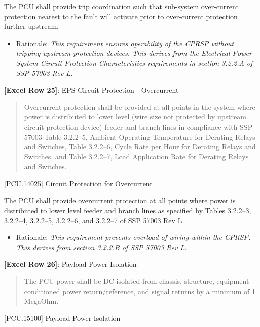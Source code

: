 The PCU shall provide trip coordination such that sub-system over-current protection nearest to the fault will activate prior to over-current protection further upstream.

\begin{itemize}
\item{} Rationale: \emph{This requirement ensures operability of the CPRSP without tripping upstream protection devices. This derives from the Electrical Power System Circuit Protection Characteristics requirements in section 3.2.2.A of SSP 57003 Rev L.}

\end{itemize}

\textbf{[Excel Row 25]}: EPS Circuit Protection - Overcurrent

\begin{quote}
Overcurrent protection shall be provided at all points in the system where power is distributed to lower level (wire size not protected by upstream circuit protection device) feeder and branch lines in compliance with SSP 57003 Table 3.2.2--5, Ambient Operating Temperature for Derating Relays and Switches, Table 3.2.2--6, Cycle Rate per Hour for Derating Relays and Switches, and Table 3.2.2--7, Load Application Rate for Derating Relays and Switches.
\end{quote}

[PCU.14025] Circuit Protection for Overcurrent

The PCU shall provide overcurrent protection at all points where power is distributed to lower level feeder and branch lines as specified by Tables 3.2.2--3, 3.2.2--4, 3.2.2--5, 3.2.2--6, and 3.2.2--7 of SSP 57003 Rev L.

\begin{itemize}
\item{} Rationale: \emph{This requirement prevents overload of wiring within the CPRSP. This derives from section 3.2.2.B of SSP 57003 Rev L.}

\end{itemize}

\textbf{[Excel Row 26]}: Payload Power Isolation

\begin{quote}
The PCU power shall be DC isolated from chassis, structure, equipment conditioned power return\slash reference, and signal returns by a minimum of 1 MegaOhm.
\end{quote}

[PCU.15100] Payload Power Isolation

